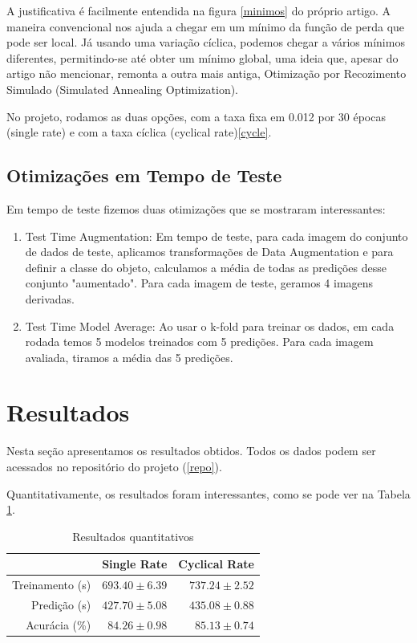 \documentclass[conference]{IEEEtran}
\begin{document}
A justificativa é facilmente entendida na figura \ref{minimos} do próprio artigo.  A maneira convencional nos ajuda a chegar em um mínimo da função de perda que pode ser local. Já usando uma variação cíclica, podemos chegar a vários mínimos diferentes, permitindo-se até obter um mínimo global, uma ideia que, apesar do artigo não mencionar, remonta a outra mais antiga, Otimização por Recozimento Simulado (Simulated Annealing Optimization)\cite{annealing}.

No projeto, rodamos as duas opções, com a taxa fixa em 0.012 por 30 épocas (single rate) e com a taxa cíclica (cyclical rate)\ref{cycle}.


\subsection{Otimizações em Tempo de Teste}

Em tempo de teste fizemos duas otimizações que se mostraram interessantes:
\begin{enumerate}
\item Test Time Augmentation: Em tempo de teste, para cada imagem do conjunto de dados de teste, aplicamos transformações de Data Augmentation e para definir a classe do objeto, calculamos a média de todas as predições desse conjunto "aumentado".  Para cada imagem de teste, geramos 4 imagens derivadas.
\item Test Time Model Average: Ao usar o k-fold para treinar os dados, em cada rodada temos 5 modelos treinados com 5 predições. Para cada imagem avaliada, tiramos a média das 5 predições.
\end{enumerate}


\section{Resultados}
Nesta seção apresentamos os resultados obtidos. Todos os dados podem ser acessados no repositório do projeto (\ref{repo}).

Quantitativamente, os resultados foram interessantes, como se pode ver na Tabela \ref{tabela}.
\begin{table}[]
\centering
\caption{Resultados quantitativos}
\label{tabela}
\begin{tabular}{@{}rrr@{}}
\toprule
            & \multicolumn{1}{c}{Single Rate} & \multicolumn{1}{c}{Cyclical Rate} \\ \midrule
Treinamento (s) & \(693.40\pm6.39\)& \(737.24\pm2.52\)                                  \\ \midrule
Predição (s)    & \(427.70\pm5.08\)&  \(435.08\pm0.88\)                                \\ \midrule
Acurácia  (\%)  & \(84.26\pm0.98\)  & \(85.13\pm0.74\)                              \\ \bottomrule
\end{tabular}
\end{table}
\end{document}
